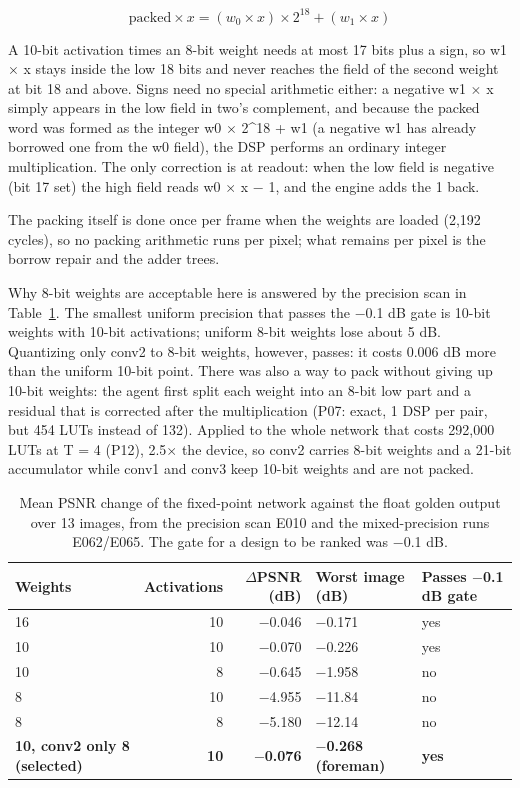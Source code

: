 \begin{equation}
\text{packed} \times x = (w_0 \times x) \times 2^{18} + (w_1 \times x)
\end{equation}

A 10-bit activation times an 8-bit weight needs at most 17 bits plus a sign, so w1 $\times$ x stays inside the low 18 bits and never reaches the field of the second weight at bit 18 and above. Signs need no special arithmetic either: a negative w1 $\times$ x simply appears in the low field in two's complement, and because the packed word was formed as the integer w0 $\times$ 2\^{}18 + w1 (a negative w1 has already borrowed one from the w0 field), the DSP performs an ordinary integer multiplication. The only correction is at readout: when the low field is negative (bit 17 set) the high field reads w0 $\times$ x $-$ 1, and the engine adds the 1 back.

The packing itself is done once per frame when the weights are loaded (2,192 cycles), so no packing arithmetic runs per pixel; what remains per pixel is the borrow repair and the adder trees.

Why 8-bit weights are acceptable here is answered by the precision scan in Table~\ref{tab:8}. The smallest uniform precision that passes the $-$0.1 dB gate is 10-bit weights with 10-bit activations; uniform 8-bit weights lose about 5 dB. Quantizing only conv2 to 8-bit weights, however, passes: it costs 0.006 dB more than the uniform 10-bit point. There was also a way to pack without giving up 10-bit weights: the agent first split each weight into an 8-bit low part and a residual that is corrected after the multiplication (P07: exact, 1 DSP per pair, but 454 LUTs instead of 132). Applied to the whole network that costs 292,000 LUTs at T = 4 (P12), 2.5$\times$ the device, so conv2 carries 8-bit weights and a 21-bit accumulator while conv1 and conv3 keep 10-bit weights and are not packed.

\begin{table}[!htbp]
\centering
\footnotesize
\caption{Mean PSNR change of the fixed-point network against the float golden output over 13 images, from the precision scan E010 and the mixed-precision runs E062/E065. The gate for a design to be ranked was $-$0.1 dB.}
\label{tab:8}
\begin{tabular}{lrrll}
\toprule
Weights & Activations & $\Delta$PSNR (dB) & Worst image (dB) & Passes $-$0.1 dB gate \\
\midrule
16 & 10 & $-$0.046 & $-$0.171 & yes \\
10 & 10 & $-$0.070 & $-$0.226 & yes \\
10 & 8 & $-$0.645 & $-$1.958 & no \\
8 & 10 & $-$4.955 & $-$11.84 & no \\
8 & 8 & $-$5.180 & $-$12.14 & no \\
\textbf{10, conv2 only 8 (selected)} & \textbf{10} & \textbf{$-$0.076} & \textbf{$-$0.268 (foreman)} & \textbf{yes} \\
\bottomrule
\end{tabular}
\end{table}

